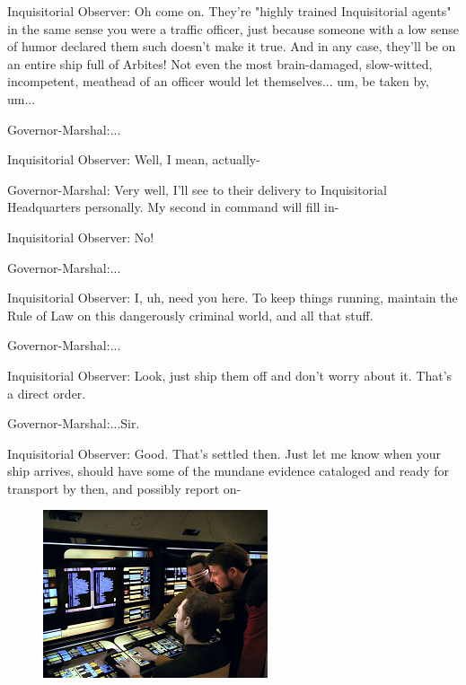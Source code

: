 Inquisitorial Observer: 
Oh come on. 
They're "highly trained Inquisitorial agents" in the same sense you were a traffic officer, just because someone with a low sense of humor declared them such doesn't make it true. 
And in any case, they'll be on an entire ship full of Arbites! 
Not even the most brain-damaged, slow-witted, incompetent, meathead of an officer would let themselves... 
um, be taken by, um...

Governor-Marshal:...

Inquisitorial Observer: 
Well, I mean, actually- 

Governor-Marshal: 
Very well, I'll see to their delivery to Inquisitorial Headquarters personally. 
My second in command will fill in-

Inquisitorial Observer: 
No!

Governor-Marshal:...

Inquisitorial Observer: 
I, uh, need you here. 
To keep things running, maintain the Rule of Law on this dangerously criminal world, and all that stuff.

Governor-Marshal:...

Inquisitorial Observer: 
Look, just ship them off and don't worry about it. 
That's a direct order.

Governor-Marshal:...Sir.

Inquisitorial Observer: 
Good. 
That's settled then. 
Just let me know when your ship arrives, should have some of the mundane evidence cataloged and ready for transport by then, and possibly report on-



\begin{figure}
	\begin{center}
		\includegraphics[width=\figwidth]{pics/20/5.png}
	\end{center}
\end{figure}



